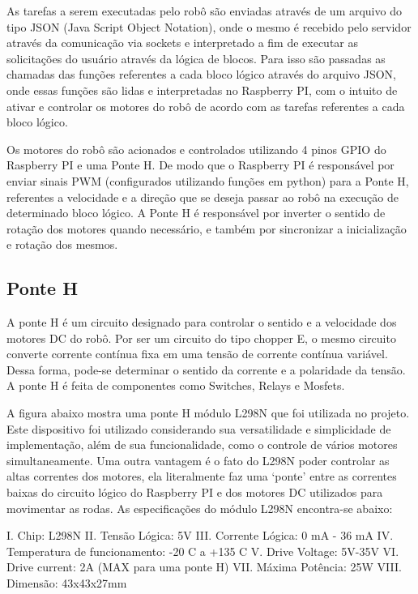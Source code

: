 As tarefas a serem executadas pelo robô são enviadas através de um arquivo do tipo JSON (Java Script Object Notation), onde o mesmo é recebido pelo servidor através da comunicação via sockets e interpretado a fim de executar as solicitações do usuário através da lógica de blocos. Para isso são passadas as chamadas das funções referentes a cada bloco lógico através do arquivo JSON, onde essas funções são lidas e interpretadas no Raspberry PI, com o intuito de ativar e controlar os motores do robô de acordo com as tarefas referentes a cada bloco lógico.

Os motores do robô são acionados e controlados utilizando 4 pinos GPIO do Raspberry PI e uma Ponte H. De modo que o Raspberry PI é responsável por enviar sinais PWM (configurados utilizando funções em python) para a Ponte H, referentes a velocidade e a direção que se deseja passar ao robô na execução de determinado bloco lógico. A Ponte H é responsável por inverter o sentido de rotação dos motores quando necessário, e também por sincronizar a inicialização e rotação dos mesmos.

\subsection{Ponte H}

A ponte H é um circuito designado para controlar o sentido e a velocidade dos motores DC do robô. Por ser um circuito do tipo chopper E, o mesmo circuito converte corrente contínua fixa em uma tensão de corrente contínua variável. Dessa forma, pode-se determinar o sentido da corrente e a polaridade da tensão. A ponte H é feita de componentes como Switches, Relays e Mosfets.

A figura abaixo mostra uma ponte H módulo L298N que foi utilizada no projeto. Este dispositivo foi utilizado considerando sua versatilidade e simplicidade de implementação, além de sua funcionalidade, como o controle de vários motores simultaneamente. Uma outra vantagem é o fato do L298N poder controlar as altas correntes dos motores, ela literalmente faz uma ‘ponte’ entre as correntes baixas do circuito lógico do Raspberry PI e dos motores DC utilizados para movimentar as rodas. As especificações do módulo L298N encontra-se abaixo:

I.	Chip: L298N
II.	Tensão Lógica: 5V
III.	Corrente Lógica: 0 mA - 36 mA
IV.	Temperatura de funcionamento: -20 C a +135 C
V.	Drive Voltage: 5V-35V
VI.	Drive current: 2A (MAX para uma ponte H)
VII.	Máxima Potência: 25W
VIII.	Dimensão: 43x43x27mm

